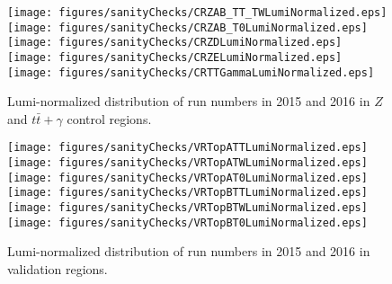 \begin{figure}[htbp]
\begin{center} 

\texttt{[image: figures/sanityChecks/CRZAB\_TT\_TWLumiNormalized.eps]}
\texttt{[image: figures/sanityChecks/CRZAB\_T0LumiNormalized.eps]}
\texttt{[image: figures/sanityChecks/CRZDLumiNormalized.eps]}
\texttt{[image: figures/sanityChecks/CRZELumiNormalized.eps]}
\texttt{[image: figures/sanityChecks/CRTTGammaLumiNormalized.eps]}

\caption{Lumi-normalized distribution of run numbers in 2015 and 2016
  in $Z$ and $t\bar{t}+\gamma$ control regions.}
\label{fig:Fit2ele_3}
\end{center}
\end{figure}





\begin{figure}[htbp]
\begin{center} 
\texttt{[image: figures/sanityChecks/VRTopATTLumiNormalized.eps]}
\texttt{[image: figures/sanityChecks/VRTopATWLumiNormalized.eps]}
\texttt{[image: figures/sanityChecks/VRTopAT0LumiNormalized.eps]}
\texttt{[image: figures/sanityChecks/VRTopBTTLumiNormalized.eps]}
\texttt{[image: figures/sanityChecks/VRTopBTWLumiNormalized.eps]}
\texttt{[image: figures/sanityChecks/VRTopBT0LumiNormalized.eps]}
\caption{Lumi-normalized distribution of run numbers in 2015 and 2016 in validation regions.}
\label{fig:Fit2ele}
\end{center}
\end{figure}

